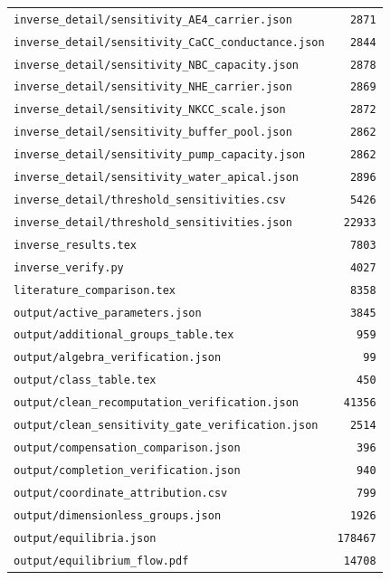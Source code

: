 \begin{longtable}{p{.78\linewidth}r}
\nolinkurl{inverse_detail/sensitivity_AE4_carrier.json} & \texttt{2871} \\
\nolinkurl{inverse_detail/sensitivity_CaCC_conductance.json} & \texttt{2844} \\
\nolinkurl{inverse_detail/sensitivity_NBC_capacity.json} & \texttt{2878} \\
\nolinkurl{inverse_detail/sensitivity_NHE_carrier.json} & \texttt{2869} \\
\nolinkurl{inverse_detail/sensitivity_NKCC_scale.json} & \texttt{2872} \\
\nolinkurl{inverse_detail/sensitivity_buffer_pool.json} & \texttt{2862} \\
\nolinkurl{inverse_detail/sensitivity_pump_capacity.json} & \texttt{2862} \\
\nolinkurl{inverse_detail/sensitivity_water_apical.json} & \texttt{2896} \\
\nolinkurl{inverse_detail/threshold_sensitivities.csv} & \texttt{5426} \\
\nolinkurl{inverse_detail/threshold_sensitivities.json} & \texttt{22933} \\
\nolinkurl{inverse_results.tex} & \texttt{7803} \\
\nolinkurl{inverse_verify.py} & \texttt{4027} \\
\nolinkurl{literature_comparison.tex} & \texttt{8358} \\
\nolinkurl{output/active_parameters.json} & \texttt{3845} \\
\nolinkurl{output/additional_groups_table.tex} & \texttt{959} \\
\nolinkurl{output/algebra_verification.json} & \texttt{99} \\
\nolinkurl{output/class_table.tex} & \texttt{450} \\
\nolinkurl{output/clean_recomputation_verification.json} & \texttt{41356} \\
\nolinkurl{output/clean_sensitivity_gate_verification.json} & \texttt{2514} \\
\nolinkurl{output/compensation_comparison.json} & \texttt{396} \\
\nolinkurl{output/completion_verification.json} & \texttt{940} \\
\nolinkurl{output/coordinate_attribution.csv} & \texttt{799} \\
\nolinkurl{output/dimensionless_groups.json} & \texttt{1926} \\
\nolinkurl{output/equilibria.json} & \texttt{178467} \\
\nolinkurl{output/equilibrium_flow.pdf} & \texttt{14708} \\

\end{longtable}
